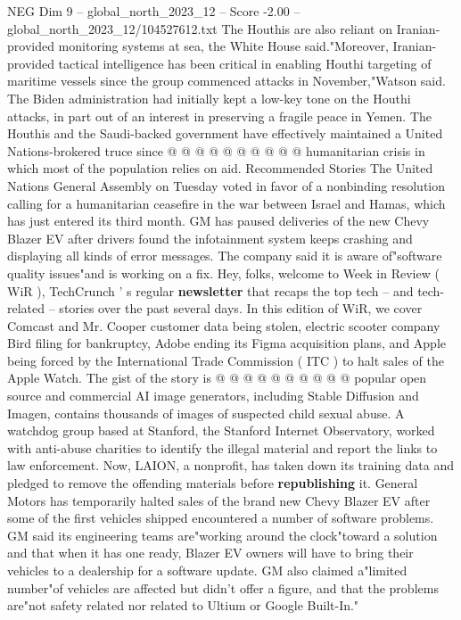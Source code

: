 \begin{textsample}{NEG Dim 9 – global\_north\_2023\_12 – Score -2.00 – global\_north\_2023\_12/104527612.txt}
The Houthis are also reliant on Iranian-provided monitoring systems at sea, the White House said."Moreover, Iranian-provided tactical intelligence has been critical in enabling Houthi targeting of maritime vessels since the group commenced attacks in November,"Watson said.
The Biden administration had initially kept a low-key tone on the Houthi attacks, in part out of an interest in preserving a fragile peace in Yemen.
The Houthis and the Saudi-backed government have effectively maintained a United Nations-brokered truce since @ @ @ @ @ @ @ @ @ @ humanitarian crisis in which most of the population relies on aid.
Recommended Stories The United Nations General Assembly on Tuesday voted in favor of a nonbinding resolution calling for a humanitarian ceasefire in the war between Israel and Hamas, which has just entered its third month.
GM has paused deliveries of the new Chevy Blazer EV after drivers found the infotainment system keeps crashing and displaying all kinds of error messages.
The company said it is aware of"software quality issues"and is working on a fix.
Hey, folks, welcome to Week in Review ( WiR ), TechCrunch ' s regular \textbf{newsletter} that recaps the top tech -- and tech-related -- stories over the past several days.
In this edition of WiR, we cover Comcast and Mr.
Cooper customer data being stolen, electric scooter company Bird filing for bankruptcy, Adobe ending its Figma acquisition plans, and Apple being forced by the International Trade Commission ( ITC ) to halt sales of the Apple Watch.
The gist of the story is @ @ @ @ @ @ @ @ @ @ popular open source and commercial AI image generators, including Stable Diffusion and Imagen, contains thousands of images of suspected child sexual abuse.
A watchdog group based at Stanford, the Stanford Internet Observatory, worked with anti-abuse charities to identify the illegal material and report the links to law enforcement.
Now, LAION, a nonprofit, has taken down its training data and pledged to remove the offending materials before \textbf{republishing} it.
General Motors has temporarily halted sales of the brand new Chevy Blazer EV after some of the first vehicles shipped encountered a number of software problems.
GM said its engineering teams are"working around the clock"toward a solution and that when it has one ready, Blazer EV owners will have to bring their vehicles to a dealership for a software update.
GM also claimed a"limited number"of vehicles are affected but didn't offer a figure, and that the problems are"not safety related nor related to Ultium or Google Built-In."

\end{textsample}
